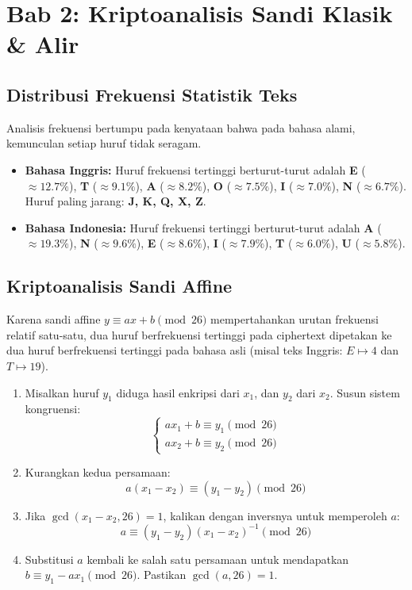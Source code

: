 \documentclass[11pt,a4paper]{article}
\begin{document}
\newpage
\section{Bab 2: Kriptoanalisis Sandi Klasik \& Alir}

\subsection{Distribusi Frekuensi Statistik Teks}
Analisis frekuensi bertumpu pada kenyataan bahwa pada bahasa alami, kemunculan setiap huruf tidak seragam.
\begin{itemize}[leftmargin=*]
    \item \textbf{Bahasa Inggris:} Huruf frekuensi tertinggi berturut-turut adalah \textbf{E} ($\approx 12.7\%$), \textbf{T} ($\approx 9.1\%$), \textbf{A} ($\approx 8.2\%$), \textbf{O} ($\approx 7.5\%$), \textbf{I} ($\approx 7.0\%$), \textbf{N} ($\approx 6.7\%$). Huruf paling jarang: \textbf{J, K, Q, X, Z}.
    \item \textbf{Bahasa Indonesia:} Huruf frekuensi tertinggi berturut-turut adalah \textbf{A} ($\approx 19.3\%$), \textbf{N} ($\approx 9.6\%$), \textbf{E} ($\approx 8.6\%$), \textbf{I} ($\approx 7.9\%$), \textbf{T} ($\approx 6.0\%$), \textbf{U} ($\approx 5.8\%$).
\end{itemize}

\subsection{Kriptoanalisis Sandi Affine}
Karena sandi affine $y \equiv ax + b \pmod{26}$ mempertahankan urutan frekuensi relatif satu-satu, dua huruf berfrekuensi tertinggi pada ciphertext dipetakan ke dua huruf berfrekuensi tertinggi pada bahasa asli (misal teks Inggris: $E \mapsto 4$ dan $T \mapsto 19$).
\begin{enumerate}[leftmargin=*]
    \item Misalkan huruf $y_1$ diduga hasil enkripsi dari $x_1$, dan $y_2$ dari $x_2$. Susun sistem kongruensi:
    \[
    \begin{cases}
    a x_1 + b \equiv y_1 \pmod{26} \\
    a x_2 + b \equiv y_2 \pmod{26}
    \end{cases}
    \]
    \item Kurangkan kedua persamaan:
    \[
    a(x_1 - x_2) \equiv (y_1 - y_2) \pmod{26}
    \]
    \item Jika $\gcd(x_1 - x_2, 26) = 1$, kalikan dengan inversnya untuk memperoleh $a$:
    \[
    a \equiv (y_1 - y_2)(x_1 - x_2)^{-1} \pmod{26}
    \]
    \item Substitusi $a$ kembali ke salah satu persamaan untuk mendapatkan $b \equiv y_1 - ax_1 \pmod{26}$. Pastikan $\gcd(a, 26) = 1$.
\end{enumerate}
\end{document}
